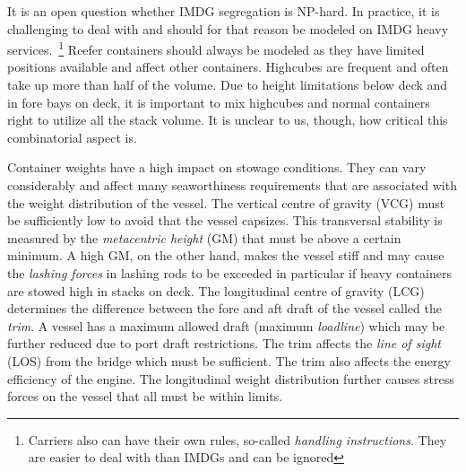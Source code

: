 \documentclass[preprint,12pt,authoryear]{elsarticle}
\begin{document}
It is an open question whether IMDG segregation is NP-hard. In practice, it is challenging to deal with and should for that reason be modeled on IMDG heavy services.~\footnote{Carriers also can have their own rules, so-called {\em handling instructions}. They are easier to deal with than IMDGs and can be ignored} Reefer containers should always be modeled as they have limited positions available and affect other containers. Highcubes are frequent and often take up more than half of the volume. Due to height limitations below deck and in fore bays on deck, it is important to mix highcubes and normal containers right to utilize all the stack volume. It is unclear to us, though, how critical this combinatorial aspect is. 

Container weights have a high impact on stowage conditions. They can vary considerably and affect many seaworthiness requirements that are associated with the weight distribution of the vessel. The vertical centre of gravity (VCG) must be sufficiently low to avoid that the vessel capsizes. This transversal stability is measured by the {\em metacentric height} (GM) that must be above a certain minimum. A high GM, on the other hand, makes the vessel stiff and may cause the {\em lashing forces} in lashing rods to be exceeded in particular if heavy containers are stowed high in stacks on deck. The longitudinal centre of gravity (LCG) determines the difference between the fore and aft draft of the vessel called the {\em trim}. A vessel has a maximum allowed draft (maximum {\em loadline}) which may be further reduced due to port draft restrictions. The trim affects the {\em line of sight} (LOS) from the bridge which must be sufficient. The trim also affects the energy efficiency of the engine. The longitudinal weight distribution further causes stress forces on the vessel that all must be within limits.
\end{document}
